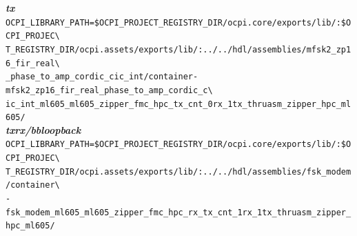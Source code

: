 \noindent\textbf{\textit{tx}}\\
\verb|OCPI_LIBRARY_PATH=$OCPI_PROJECT_REGISTRY_DIR/ocpi.core/exports/lib/:$OCPI_PROJEC\| \\
\verb|T_REGISTRY_DIR/ocpi.assets/exports/lib/:../../hdl/assemblies/mfsk2_zp16_fir_real\| \\
\verb|_phase_to_amp_cordic_cic_int/container-mfsk2_zp16_fir_real_phase_to_amp_cordic_c\| \\
\verb|ic_int_ml605_ml605_zipper_fmc_hpc_tx_cnt_0rx_1tx_thruasm_zipper_hpc_ml605/| \\

\noindent\textbf{\textit{txrx/bbloopback}}\\
\verb|OCPI_LIBRARY_PATH=$OCPI_PROJECT_REGISTRY_DIR/ocpi.core/exports/lib/:$OCPI_PROJEC\| \\
\verb|T_REGISTRY_DIR/ocpi.assets/exports/lib/:../../hdl/assemblies/fsk_modem/container\| \\
\verb|-fsk_modem_ml605_ml605_zipper_fmc_hpc_rx_tx_cnt_1rx_1tx_thruasm_zipper_hpc_ml605/| \\
\pagebreak

